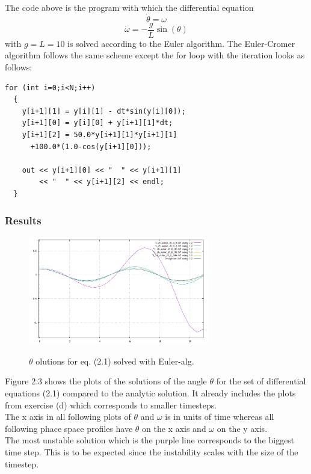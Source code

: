 \documentclass[12pt,a4paper]{article}	%
\begin{document}
The code above is the program with which the differential equation 
\begin{equation}
\dot{\theta}  = \omega  \nonumber
\end{equation}
\begin{equation}
\dot{\omega}  = -\frac{g}{L} \sin(\theta) 
\end{equation}
with $g = L = 10$ is solved according to the Euler algorithm. The Euler-Cromer algorithm follows the same scheme except the for loop with the iteration looks as follows:
\\
\begin{lstlisting}[frame=single]  
for (int i=0;i<N;i++)
  {
    y[i+1][1] = y[i][1] - dt*sin(y[i][0]);
    y[i+1][0] = y[i][0] + y[i+1][1]*dt;
    y[i+1][2] = 50.0*y[i+1][1]*y[i+1][1]
      +100.0*(1.0-cos(y[i+1][0]));

    out << y[i+1][0] << "  " << y[i+1][1]
        << "  " << y[i+1][2] << endl;
  }
\end{lstlisting}
\newpage

\subsubsection{Results}

\begin{figure}[h!]		
\centering
{\includegraphics[width=0.7\textwidth]{3_2_b_thetaplots.png}}		
\caption{$\theta$ olutions for eq. (2.1) solved with Euler-alg.}
\end{figure}

Figure 2.3 shows the plots of the solutions of the angle $\theta$ for the set of differential equations  (2.1) compared to the analytic solution. It already includes the plots from exercise (d) which corresponds to smaller timesteps. \\
The x axis in all following plots of $\theta$ and $\omega$ is in units of time whereas all following phace space profiles have $\theta$ on the x axis and $\omega$ on the y axis. \\
The most unstable solution which is the purple line corresponds to the biggest time step. This is to be expected since the instability scales with the size of the timestep. 
\end{document}
